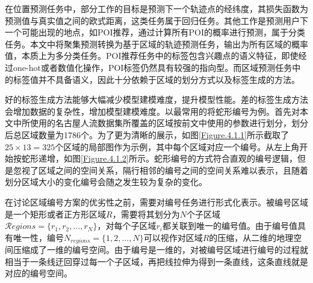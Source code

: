\documentclass[master]{thesis-uestc}
\begin{document}
在位置预测任务中，部分工作的目标是预测下一个轨迹点的经纬度，其损失函数为预测值与真实值之间的欧式距离，这类任务属于回归任务。其他工作是预测用户下一个可能出现的地点，如POI推荐，通过计算所有POI的概率进行预测，属于分类任务。本文中将聚集预测转换为基于区域的轨迹预测任务，输出为所有区域的概率值，本质上为多分类任务。POI推荐任务中的标签包含兴趣点的语义特征，即使经过one-hot或者数值化操作，POI标签仍然具有较强的指向型。而区域预测任务中的标签值并不具备语义，因此十分依赖于区域的划分方式以及标签生成的方法。

好的标签生成方法能够大幅减少模型建模难度，提升模型性能。差的标签生成方法会增加数据的复杂性，增加模型建模难度。以最常用的将蛇形编号为例。首先对本文中所使用的名古屋人流数据集所覆盖的区域按前文中使用的参数进行划分，划分后总区域数量为1786个。为了更为清晰的展示，如图\ref{Figure.4.1.1}所示截取了$25\times 13=325$个区域的局部图作为示例，其中每个区域对应一个编号。从左上角开始按蛇形递增，如图\ref{Figure.4.1.2}所示。蛇形编号的方式符合直观的编号逻辑，但是忽视了区域之间的空间关系，隔行相邻的编号之间的空间关系难以表示，且随着划分区域大小的变化编号会随之发生较为复杂的变化。

在讨论区域编号方案的优劣性之前，需要对编号任务进行形式化表示。被编号区域是一个矩形或者正方形区域$R$，需要将其划分为$N$个子区域$\mathcal{R}egions=\{r_1,r_2,\dots,r_N\}$，对每个子区域$r_i$都关联到唯一的编号值。由于编号值具有唯一性，编号$N_{regions} = \{1,2,\dots,N\}$可以视作对区域$R$的压缩，从二维的地理空间压缩成了一维的编号空间。由于编号是一维的，对被编号区域进行编号的过程就相当于一条线迂回穿过每一个子区域，再把线拉伸为得到一条直线，这条直线就是对应的编号空间。
\end{document}

